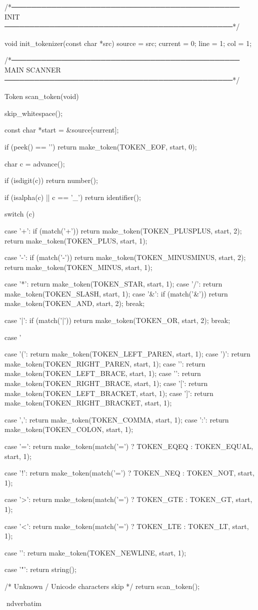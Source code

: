 \documentclass{article}
\begin{document}
/*──────────────────────────────────────────────
  INIT
──────────────────────────────────────────────*/

void init_tokenizer(const char *src)
{
    source  = src;
    current = 0;
    line    = 1;
    col     = 1;
}

/*──────────────────────────────────────────────
  MAIN SCANNER
──────────────────────────────────────────────*/

Token scan_token(void)
{
    skip_whitespace();

    const char *start = &source[current];

    if (peek() == '\0')
        return make_token(TOKEN_EOF, start, 0);

    char c = advance();

    if (isdigit(c))
        return number();

    if (isalpha(c) || c == '_')
        return identifier();

    switch (c) {

        case '+':
         if (match('+')) return make_token(TOKEN_PLUSPLUS, start, 2);
                   return make_token(TOKEN_PLUS, start, 1);

        case '-':
         if (match('-')) return make_token(TOKEN_MINUSMINUS, start, 2);
                   return make_token(TOKEN_MINUS, start, 1);

        case '*': return make_token(TOKEN_STAR, start, 1);
        case '/': return make_token(TOKEN_SLASH, start, 1);
        case '&':
    if (match('&')) return make_token(TOKEN_AND, start, 2);
             break;

        case '|':
    if (match('|')) return make_token(TOKEN_OR, start, 2);
             break;

        case '%

        case '(': return make_token(TOKEN_LEFT_PAREN, start, 1);
        case ')': return make_token(TOKEN_RIGHT_PAREN, start, 1);
        case '{': return make_token(TOKEN_LEFT_BRACE, start, 1);
        case '}': return make_token(TOKEN_RIGHT_BRACE, start, 1);
        case '[': return make_token(TOKEN_LEFT_BRACKET, start, 1);
        case ']': return make_token(TOKEN_RIGHT_BRACKET, start, 1);

        case ',': return make_token(TOKEN_COMMA, start, 1);
        case ':': return make_token(TOKEN_COLON, start, 1);

        case '=':
            return make_token(match('=') ? TOKEN_EQEQ : TOKEN_EQUAL, start, 1);

        case '!':
            return make_token(match('=') ? TOKEN_NEQ : TOKEN_NOT, start, 1);

        case '>':
            return make_token(match('=') ? TOKEN_GTE : TOKEN_GT, start, 1);

        case '<':
            return make_token(match('=') ? TOKEN_LTE : TOKEN_LT, start, 1);

        case '\n':
            return make_token(TOKEN_NEWLINE, start, 1);

        case '"':
            return string();
    }

    /* Unknown / Unicode characters skip */
    return scan_token();
}
nd{verbatim}
\end{document}
